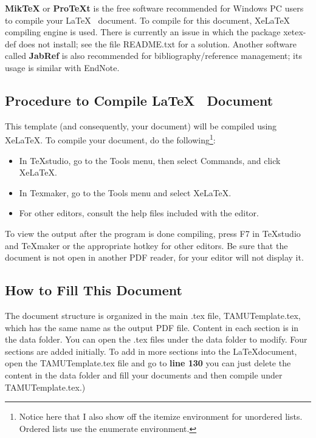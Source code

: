 \textbf{MikTeX} or \textbf{ProTeXt} is the free software recommended for Windows PC users to
compile your \LaTeX ~ document. To compile for this document, XeLaTeX compiling engine
is used. There is currently an issue in which the package xetex-def does not install; see the file README.txt for a solution. Another software called \textbf{JabRef} is also recommended for bibliography/reference management; its usage is similar with EndNote.

\subsection*{Procedure to Compile \LaTeX ~ Document}

This template (and consequently, your document) will be compiled using XeLaTeX. To compile your document, do the following\footnote{Notice here that I also show off the itemize environment for unordered lists. Ordered lists use the enumerate environment.}:

\begin{itemize}
	\item In TeXstudio, go to the Tools menu, then select Commands, and click XeLaTeX.
	
	\item In Texmaker, go to the Tools menu and select XeLaTeX.
	
	\item For other editors, consult the help files included with the editor.
\end{itemize}

To view the output after the program is done compiling, press F7 in TeXstudio and TeXmaker or the appropriate hotkey for other editors. Be sure that the document is not open in another PDF reader, for your editor will not display it.

\subsection{How to Fill This Document}
The document structure is organized in the main .tex file, TAMUTemplate.tex,
which has the same name as the output PDF file. Content in each section is in the data folder. You can open the .tex files under the data folder to modify. Four sections
are added initially. To add in more sections into the \LaTeX document, open the
TAMUTemplate.tex file and go to \textbf{line 130} you can just delete the content in the data folder and fill your documents and then compile under TAMUTemplate.tex.)

